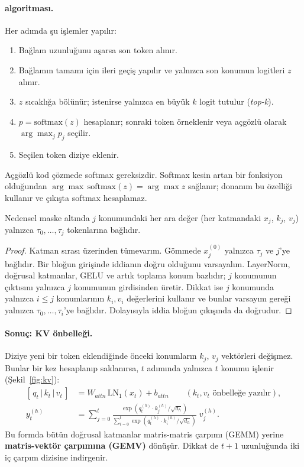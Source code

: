 \paragraph{ algoritması.} Her adımda şu işlemler yapılır:
\begin{enumerate}
  \item Bağlam  uzunluğunu aşarsa son  token alınır.
  \item Bağlamın tamamı için ileri geçiş yapılır ve yalnızca son konumun logitleri $z$ alınır.
  \item $z$ sıcaklığa bölünür; istenirse yalnızca en büyük $k$ logit tutulur (\emph{top-k}).
  \item $p = \mathrm{softmax}(z)$ hesaplanır; sonraki token örneklenir veya açgözlü olarak $\arg\max_j p_j$ seçilir.
  \item Seçilen token diziye eklenir.
\end{enumerate}
Açgözlü kod çözmede softmax gereksizdir. Softmax kesin artan bir fonksiyon olduğundan $\arg\max\,\mathrm{softmax}(z) = \arg\max z$ sağlanır; donanım bu özelliği kullanır ve çıkışta softmax hesaplamaz.

\begin{onerme}\label{on:nedensel}
Nedensel maske altında $j$ konumundaki her ara değer (her katmandaki $x_j$, $k_j$, $v_j$) yalnızca $\tau_0,\dots,\tau_j$ tokenlarına bağlıdır.
\end{onerme}
\begin{proof}
Katman sırası üzerinden tümevarım. Gömmede $x^{(0)}_j$ yalnızca $\tau_j$ ve $j$'ye bağlıdır. Bir bloğun girişinde iddianın doğru olduğunu varsayalım. LayerNorm, doğrusal katmanlar, GELU ve artık toplama konum bazlıdır; $j$ konumunun çıktısını yalnızca $j$ konumunun girdisinden üretir. Dikkat ise $j$ konumunda yalnızca $i \le j$ konumlarının $k_i, v_i$ değerlerini kullanır ve bunlar varsayım gereği yalnızca $\tau_0,\dots,\tau_i$'ye bağlıdır. Dolayısıyla iddia bloğun çıkışında da doğrudur.
\end{proof}

\paragraph{Sonuç: KV önbelleği.} Diziye yeni bir token eklendiğinde önceki konumların $k_j$, $v_j$ vektörleri değişmez. Bunlar bir kez hesaplanıp saklanırsa, $t$ adımında yalnızca $t$ konumu işlenir (Şekil~\ref{fig:kv}):
\begin{equation}
\begin{aligned}
  [\,q_t \,|\, k_t \,|\, v_t\,] &= W_{attn}\, \mathrm{LN}_1(x_t) + b_{attn} \qquad (k_t, v_t \text{ önbelleğe yazılır}), \\
  y^{(h)}_t &= \sum_{j=0}^{t} \frac{\exp\!\left(q^{(h)}_t \cdot k^{(h)}_j / \sqrt{d_h}\right)}{\sum_{i=0}^{t} \exp\!\left(q^{(h)}_t \cdot k^{(h)}_i / \sqrt{d_h}\right)}\; v^{(h)}_j .
\end{aligned}
\end{equation}
Bu formda bütün doğrusal katmanlar matris-matris çarpımı (GEMM) yerine \textbf{matris-vektör çarpımına (GEMV)} dönüşür. Dikkat de $t+1$ uzunluğunda iki iç çarpım dizisine indirgenir.

